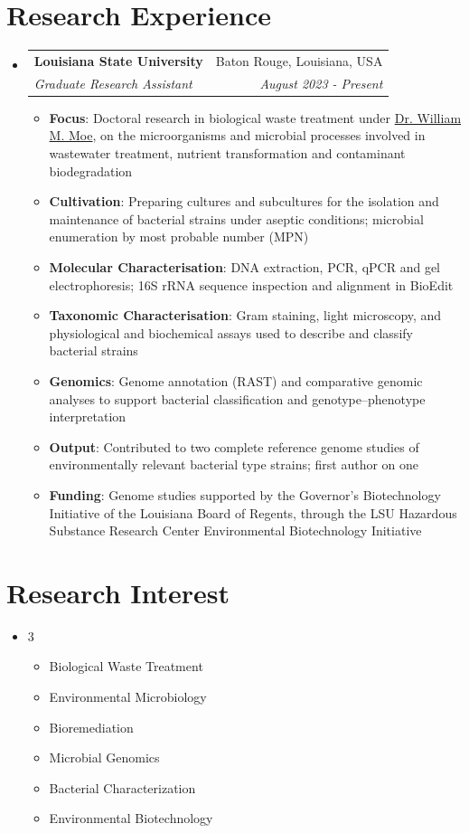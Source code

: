 \documentclass[letterpaper,20pt]{article}
\makeatletter
\newcommand{\resumeItem}[2]{
  \item\small{
    \textbf{#1}{: #2 \vspace{-2pt}}
  }
}
\newcommand{\resumeSubheading}[4]{
  \vspace{-1pt}\item
    \begin{tabular*}{0.97\textwidth}{l@{\extracolsep{\fill}}r}
      \textbf{#1} & #2 \\
      \textit{\small#3} & \textit{\small #4} \\
    \end{tabular*}\vspace{-7pt}
}
\newcommand{\resumeSubHeadingListStart}{\begin{itemize}[leftmargin=*]}
\newcommand{\resumeSubHeadingListEnd}{\end{itemize}}
\newcommand{\resumeItemListStart}{\begin{itemize}}
\newcommand{\resumeItemListEnd}{\end{itemize}\vspace{-5pt}}
\makeatother
\begin{document}
\section{Research Experience}
  \resumeSubHeadingListStart
    \resumeSubheading
      {Louisiana State University}{Baton Rouge, Louisiana, USA}
      {Graduate Research Assistant}{August 2023 - Present}
      \resumeItemListStart
        \resumeItem{Focus}{Doctoral research in biological waste treatment under \href{https://www.lsu.edu/eng/cee/people/Moe.php}{Dr. William M. Moe}, on the microorganisms and microbial processes involved in wastewater treatment, nutrient transformation and contaminant biodegradation}
        \resumeItem{Cultivation}{Preparing cultures and subcultures for the isolation and maintenance of bacterial strains under aseptic conditions; microbial enumeration by most probable number (MPN)}
        \resumeItem{Molecular Characterisation}{DNA extraction, PCR, qPCR and gel electrophoresis; 16S rRNA sequence inspection and alignment in BioEdit}
        \resumeItem{Taxonomic Characterisation}{Gram staining, light microscopy, and physiological and biochemical assays used to describe and classify bacterial strains}
        \resumeItem{Genomics}{Genome annotation (RAST) and comparative genomic analyses to support bacterial classification and genotype--phenotype interpretation}
        \resumeItem{Output}{Contributed to two complete reference genome studies of environmentally relevant bacterial type strains; first author on one}
        \resumeItem{Funding}{Genome studies supported by the Governor's Biotechnology Initiative of the Louisiana Board of Regents, through the LSU Hazardous Substance Research Center Environmental Biotechnology Initiative}
      \resumeItemListEnd
  \resumeSubHeadingListEnd

\section{Research Interest}
  \resumeSubHeadingListStart
    \item[]
    \begin{multicols}{3}
      \begin{itemize}[leftmargin=*, itemsep=1pt, topsep=0pt]
        \small
        \item Biological Waste Treatment
        \item Environmental Microbiology
        \item Bioremediation
        \item Microbial Genomics
        \item Bacterial Characterization
        \item Environmental Biotechnology
      \end{itemize}
    \end{multicols}
    \vspace{-8pt}
  \resumeSubHeadingListEnd
\end{document}
